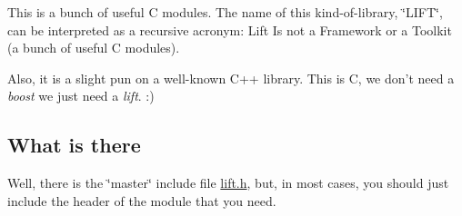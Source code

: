 This is a bunch of useful C modules. The name of this kind-\/of-\/library, \char`\"{}\-L\-I\-F\-T\char`\"{}, can be interpreted as a recursive acronym\-: Lift Is not a Framework or a Toolkit (a bunch of useful C modules).

Also, it is a slight pun on a well-\/known C++ library. This is C, we don't need a {\itshape boost} we just need a {\itshape lift}. \-:)

\subsection*{What is there}

Well, there is the \char`\"{}master\char`\"{} include file {\ttfamily \hyperlink{lift_8h}{lift.\-h}}, but, in most cases, you should just include the header of the module that you need. 